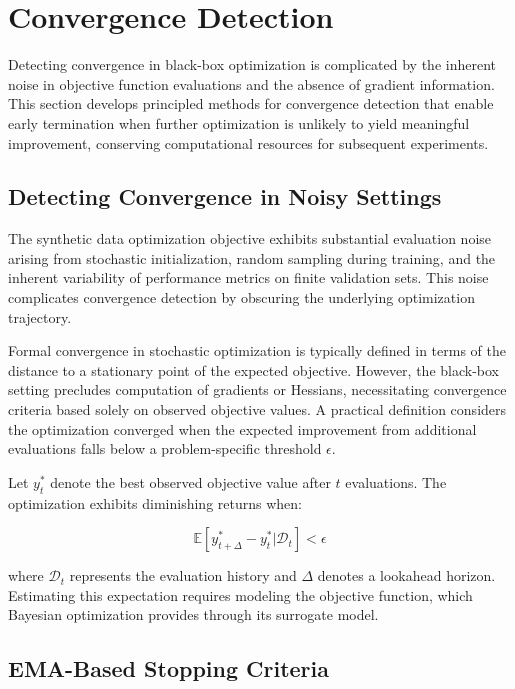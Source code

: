 \section{Convergence Detection}
\label{sec:convergence_detection}

Detecting convergence in black-box optimization is complicated by the inherent noise in objective function evaluations and the absence of gradient information. This section develops principled methods for convergence detection that enable early termination when further optimization is unlikely to yield meaningful improvement, conserving computational resources for subsequent experiments.

\subsection{Detecting Convergence in Noisy Settings}

The synthetic data optimization objective exhibits substantial evaluation noise arising from stochastic initialization, random sampling during training, and the inherent variability of performance metrics on finite validation sets. This noise complicates convergence detection by obscuring the underlying optimization trajectory.

Formal convergence in stochastic optimization is typically defined in terms of the distance to a stationary point of the expected objective. However, the black-box setting precludes computation of gradients or Hessians, necessitating convergence criteria based solely on observed objective values. A practical definition considers the optimization converged when the expected improvement from additional evaluations falls below a problem-specific threshold $\epsilon$.

Let $y_t^*$ denote the best observed objective value after $t$ evaluations. The optimization exhibits diminishing returns when:

\begin{equation}
\mathbb{E}[y_{t+\Delta}^* - y_t^* | \mathcal{D}_t] < \epsilon
\label{eq:convergence_criterion}
\end{equation}

where $\mathcal{D}_t$ represents the evaluation history and $\Delta$ denotes a lookahead horizon. Estimating this expectation requires modeling the objective function, which Bayesian optimization provides through its surrogate model.

\subsection{EMA-Based Stopping Criteria}

